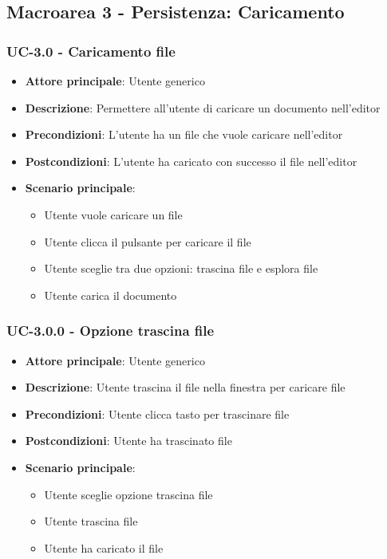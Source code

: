 \documentclass[11pt,a4paper]{article}
\begin{document}
\newpage

\subsection{Macroarea 3 - Persistenza: Caricamento}
\subsubsection{UC-3.0 - Caricamento file}
\begin{itemize}
    \item \textbf{Attore principale}: Utente generico
    \item \textbf{Descrizione}: Permettere all'utente di caricare un documento nell'editor
    \item \textbf{Precondizioni}: L'utente ha un file che vuole caricare nell'editor
    \item \textbf{Postcondizioni}: L'utente ha caricato con successo il file nell'editor
    \item \textbf{Scenario principale}:
        \begin{itemize}
            \item Utente vuole caricare un file
            \item Utente clicca il pulsante per caricare il file
            \item Utente sceglie tra due opzioni: trascina file e esplora file
            \item Utente carica il documento
        \end{itemize}
\end{itemize}


\subsubsection{UC-3.0.0 - Opzione trascina file}
\begin{itemize}
    \item \textbf{Attore principale}: Utente generico
    \item \textbf{Descrizione}: Utente trascina il file nella finestra per caricare file
    \item \textbf{Precondizioni}: Utente clicca tasto per trascinare file
    \item \textbf{Postcondizioni}: Utente ha trascinato file
    \item \textbf{Scenario principale}:
        \begin{itemize}
            \item Utente sceglie opzione trascina file
            \item Utente trascina file
            \item Utente ha caricato il file
        \end{itemize}
\end{itemize}
\end{document}
